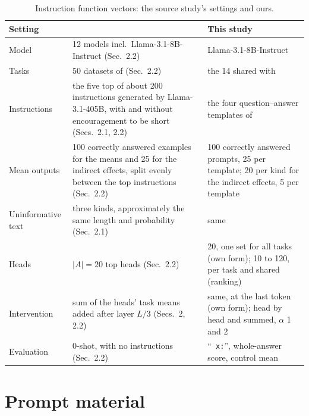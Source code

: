 \documentclass[10pt,a4paper]{article}
\newcommand{\p}[1]{``\texttt{#1}''}
\begin{document}
\begin{table}[H]
\centering\small
\begin{tabularx}{\textwidth}{@{}>{\raggedright\arraybackslash}p{3.2cm}LL@{}}
\toprule
Setting & \citet{davidson2025different} & This study \\
\midrule
Model & 12 models incl.\ Llama-3.1-8B-Instruct (Sec.~2.2) & Llama-3.1-8B-Instruct \\
Tasks & 50 datasets of \citet{todd2024function} (Sec.~2.2) & the 14 shared with \citet{yang2026shared} \\
Instructions & the five top of about 200 instructions generated by Llama-3.1-405B, with and without encouragement to be short (Secs.~2.1, 2.2) & the four question--answer templates of \citet{yang2026shared} \\
Mean outputs & 100 correctly answered examples for the means and 25 for the indirect effects, split evenly between the top instructions (Sec.~2.2) & 100 correctly answered prompts, 25 per template; 20 per kind for the indirect effects, 5 per template \\
Uninformative text & three kinds, approximately the same length and probability (Sec.~2.1) & same \\
Heads & $|A|=20$ top heads (Sec.~2.2) & 20, one set for all tasks (own form); 10 to 120, per task and shared (ranking) \\
Intervention & sum of the heads' task means added after layer $L/3$ (Secs.~2, 2.2) & same, at the last token (own form); head by head and summed, $\alpha$ 1 and 2 \\
Evaluation & 0-shot, with no instructions (Sec.~2.2) & \p{ x:}, whole-answer score, control mean \\
\bottomrule
\end{tabularx}
\caption{Instruction function vectors: the source study's settings and ours.}
\label{tab:fid-dav}
\end{table}

\section{Prompt material}\label{app:prompts}
\end{document}
